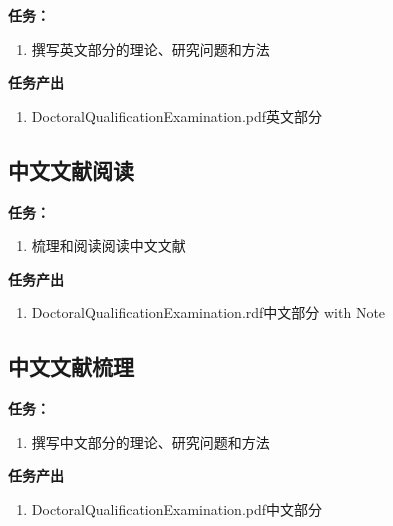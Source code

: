 \documentclass[
  12pt,
]{ctexart}
\providecommand{\tightlist}{%
  \setlength{\itemsep}{0pt}\setlength{\parskip}{0pt}}
\begin{document}
\textbf{任务：}

\begin{enumerate}
\def\labelenumi{\arabic{enumi}.}
\tightlist
\item
  撰写英文部分的理论、研究问题和方法
\end{enumerate}

\textbf{任务产出}

\begin{enumerate}
\def\labelenumi{\arabic{enumi}.}
\tightlist
\item
  DoctoralQualificationExamination.pdf英文部分
\end{enumerate}

\hypertarget{ux4e2dux6587ux6587ux732eux9605ux8bfb}{%
\subsection{中文文献阅读}\label{ux4e2dux6587ux6587ux732eux9605ux8bfb}}

\textbf{任务：}

\begin{enumerate}
\def\labelenumi{\arabic{enumi}.}
\tightlist
\item
  梳理和阅读阅读中文文献
\end{enumerate}

\textbf{任务产出}

\begin{enumerate}
\def\labelenumi{\arabic{enumi}.}
\tightlist
\item
  DoctoralQualificationExamination.rdf中文部分 with Note
\end{enumerate}

\hypertarget{ux4e2dux6587ux6587ux732eux68b3ux7406}{%
\subsection{中文文献梳理}\label{ux4e2dux6587ux6587ux732eux68b3ux7406}}

\textbf{任务：}

\begin{enumerate}
\def\labelenumi{\arabic{enumi}.}
\tightlist
\item
  撰写中文部分的理论、研究问题和方法
\end{enumerate}

\textbf{任务产出}

\begin{enumerate}
\def\labelenumi{\arabic{enumi}.}
\tightlist
\item
  DoctoralQualificationExamination.pdf中文部分
\end{enumerate}
\end{document}
